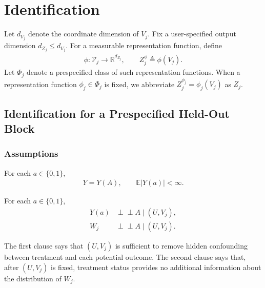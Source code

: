 \section{Identification}
\label{sec:identification}

Let $d_{V_j}$ denote the coordinate dimension of $V_j$. Fix a user-specified output dimension $d_{Z_j}\le d_{V_j}$. For a measurable representation function, define
	\begin{align}
		\phi:\mathcal V_j\longrightarrow\mathbb R^{d_{Z_j}}, \qquad Z_j^\phi\triangleq\phi(V_j).
	\end{align}
Let $\Phi_j$ denote a prespecified class of such representation functions.
When a representation function $\phi_j\in\Phi_j$ is fixed, we abbreviate $Z_j^{\phi_j}=\phi_j(V_j)$ as $Z_j$.

\subsection{Identification for a Prespecified Held-Out Block} \label{sec:fixed-held-out-block-identification}

\subsubsection{Assumptions} \label{sec:identification-assumptions}

\begin{assumption}
	\label{ass:consistency}
	For each $a\in\{0,1\}$,
	\begin{align}
		Y=Y(A), \qquad
		\mathbb E|Y(a)|<\infty.
	\label{eq:consistency}
	\end{align}
\end{assumption}

\begin{assumption} \label{ass:joint-latent-exchangeability} \label{ass:held-out-separation}
	For each $a\in\{0,1\}$,
	\begin{align}
	Y(a)&\perp\!\!\!\perp A\mid(U,V_j),
	\label{eq:joint-latent-exchangeability}\\
	W_j&\perp\!\!\!\perp A\mid(U,V_j).
	\label{eq:held-out-separation}
	\end{align}
\end{assumption}

The first clause says that $(U,V_j)$ is sufficient to remove hidden confounding between treatment and each potential outcome.
The second clause says that, after $(U,V_j)$ is fixed, treatment status provides no additional information about the distribution of $W_j$.

